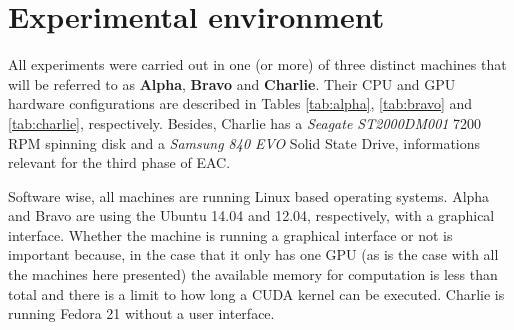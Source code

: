 \section{Experimental environment}
\label{sec:system configs}

All experiments were carried out in one (or more) of three distinct machines that will be referred to as \textbf{Alpha}, \textbf{Bravo} and \textbf{Charlie}.
Their CPU and GPU hardware configurations are described in Tables \ref{tab:alpha}, \ref{tab:bravo} and \ref{tab:charlie}, respectively.
Besides, Charlie has a \emph{Seagate ST2000DM001} 7200 RPM spinning disk and a \emph{Samsung 840 EVO} Solid State Drive, informations relevant for the third phase of EAC.%

Software wise, all machines are running Linux based operating systems.
Alpha and Bravo are using the Ubuntu 14.04 and 12.04, respectively, with a graphical interface.
Whether the machine is running a graphical interface or not is important because, in the case that it only has one GPU (as is the case with all the machines here presented) the available memory for computation is less than total and there is a limit to how long a CUDA kernel can be executed.
Charlie is running Fedora 21 without a user interface.





